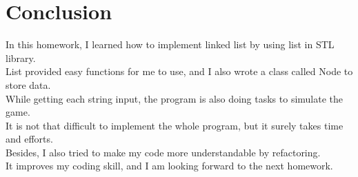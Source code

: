 \documentclass[12pt]{article}%
\begin{document}
\section{Conclusion}
In this homework, I learned how to implement linked list by using list in STL library.\\
List provided easy functions for me to use, and I also wrote a class called Node to store data.\\
While getting each string input, the program is also doing tasks to simulate the game.\\
It is not that difficult to implement the whole program, but it surely takes time and efforts.\\
Besides, I also tried to make my code more understandable by refactoring.\\
It improves my coding skill, and I am looking forward to the next homework.
\end{document}
